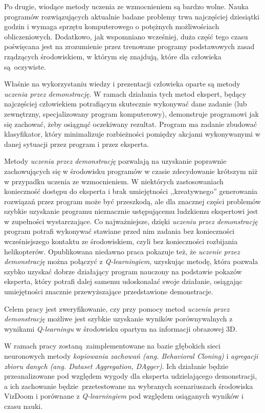 Po drugie, wiodące metody uczenia ze wzmocnieniem są bardzo wolne. Nauka programów rozwiązujących aktualnie badane problemy trwa najczęściej dziesiątki godzin i wymaga sprzętu komputerowego o potężnych możliwościach obliczeniowych. Dodatkowo, jak wspomniano wcześniej, duża część tego czasu poświęcana jest na zrozumienie przez trenowane programy podstawowych zasad rządzących środowiskiem, w którym się znajdują, które dla człowieka są oczywiste.

Właśnie na wykorzystaniu wiedzy i prezentacji człowieka oparte są metody \textit{uczenia przez demonstrację}. W ramach działania tych metod ekspert, będący najczęściej człowiekiem potrafiącym skutecznie wykonywać dane zadanie (lub zewnętrzny, specjalizowany program komputerowy), demonstruje programowi jak się zachować, żeby osiągnąć oczekiwany rezultat. Program ma zadanie zbudować klasyfikator, który minimalizuje rozbieżności pomiędzy akcjami wykonywanymi w danej sytuacji przez program i przez eksperta.

Metody \textit{uczenia przez demonstrację} pozwalają na uzyskanie poprawnie zachowujących się w środowisku programów w czasie zdecydowanie krótszym niż w przypadku uczenia ze wzmocnieniem. W niektórych zastosowaniach konieczność dostępu do eksperta i brak umiejętności ,,kreatywnego'' generowania rozwiązań przez program może być przeszkodą, ale dla znacznej części problemów szybkie uzyskanie programu nieznacznie ustępującemu ludzkiemu ekspertowi jest w zupełności wystarczające. Co najważniejsze, dzięki \textit{uczeniu przez demonstrację} program potrafi wykonywać stawiane przed nim zadania bez konieczności wcześniejszego kontaktu ze środowiskiem, czyli bez konieczności rozbijania helikopterów. Opublikowana niedawno praca \cite{DBLP:journals/corr/HesterVPLSPSDOA17} pokazuje też, że \textit{uczenie przez demonstrację} można połączyć z \textit{Q-learningiem}, uzyskując metodę, która pozwala szybko uzyskać dobrze działający program nauczony na podstawie pokazów eksperta, który potrafi dalej samemu udoskonalać swoje działanie, osiągając umiejętności znacznie przewyższające przedstawione demonstracje.


Celem pracy jest zweryfikowanie, czy przy pomocy metod \textit{uczenia przez demonstrację} możliwe jest szybkie uzyskanie wyników porównywalnych z wynikami \textit {Q-learningu} w środowisku opartym na informacji obrazowej 3D.

W ramach pracy zostaną zaimplementowane na bazie głębokich sieci neuronowych metody \textit{kopiowania zachowań (ang. Behavioral Cloning)} i \textit{agregacji zbioru danych (ang. Dataset Aggregation, DAgger)}. Ich działanie będzie przeanalizowane pod względem wygody dla eksperta udzielającego demonstracji, a ich zachowanie będzie przetestowane na wybranych scenariuszach środowiska VizDoom i porównane z \textit {Q-learningiem} pod względem osiąganych wyników i czasu nauki.

